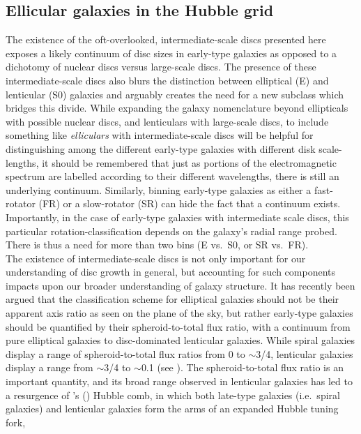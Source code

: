 \documentclass[useAMS,usenatbib,article]{mn2e}
\begin{document}
\subsection{Ellicular galaxies in the Hubble grid}
The existence of the oft-overlooked, intermediate-scale discs presented here exposes a likely continuum of disc sizes in early-type galaxies 
as opposed to a dichotomy of nuclear discs versus large-scale discs. 
The presence of these intermediate-scale discs also blurs the distinction between elliptical (E) and lenticular (S0) galaxies 
and arguably creates the need for a new subclass which bridges this divide.  
While expanding the galaxy nomenclature beyond ellipticals with possible nuclear discs, and lenticulars with large-scale discs, 
to include something like {\it elliculars} with intermediate-scale discs will be helpful 
for distinguishing among the different early-type galaxies with different disk scale-lengths, 
it should be remembered that just as portions of the electromagnetic spectrum are labelled according to their different wavelengths, 
there is still an underlying continuum.  
Similarly, binning early-type galaxies as either a fast-rotator (FR) or a slow-rotator (SR) can hide the fact that a continuum exists.  
Importantly, in the case of early-type galaxies with intermediate scale discs, 
this particular rotation-classification depends on the galaxy's radial range probed.  
There is thus a need for more than two bins (E vs.~S0, or SR vs.~FR). \\
The existence of intermediate-scale discs is not only important for our understanding of disc growth in general, 
but accounting for such components impacts upon our broader understanding of galaxy structure.  
It has recently been argued \citep{graham2014review} that the classification scheme for elliptical galaxies 
should not be their apparent axis ratio as seen on the plane of the sky, 
but rather early-type galaxies should be quantified by their spheroid-to-total flux ratio, 
with a continuum from pure elliptical galaxies to disc-dominated lenticular galaxies.   
While spiral galaxies display a range of spheroid-to-total flux ratios from 0 to $\sim$3/4, 
lenticular galaxies display a range from $\sim$3/4 to $\sim$0.1 (see \citealt{laurikainen2010}).   
The spheroid-to-total flux ratio is an important quantity, and its broad range observed in lenticular galaxies 
has led to a resurgence of \citeauthor{vandenbergh1976}'s (\citeyear{vandenbergh1976}) Hubble comb, 
in which both late-type galaxies (i.e.~spiral galaxies) and lenticular galaxies form the arms of an expanded Hubble tuning fork, 
\end{document}

